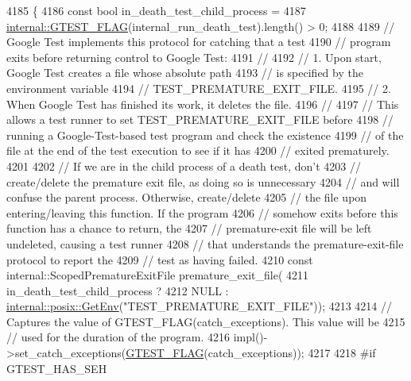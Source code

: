 \begin{DoxyCode}
4185                   \{
4186   \textcolor{keyword}{const} \textcolor{keywordtype}{bool} in\_death\_test\_child\_process =
4187       \hyperlink{gtest-port_8h_a828f4e34a1c4b510da50ec1563e3562a}{internal::GTEST\_FLAG}(internal\_run\_death\_test).length() > 0;
4188 
4189   \textcolor{comment}{// Google Test implements this protocol for catching that a test}
4190   \textcolor{comment}{// program exits before returning control to Google Test:}
4191   \textcolor{comment}{//}
4192   \textcolor{comment}{//   1. Upon start, Google Test creates a file whose absolute path}
4193   \textcolor{comment}{//      is specified by the environment variable}
4194   \textcolor{comment}{//      TEST\_PREMATURE\_EXIT\_FILE.}
4195   \textcolor{comment}{//   2. When Google Test has finished its work, it deletes the file.}
4196   \textcolor{comment}{//}
4197   \textcolor{comment}{// This allows a test runner to set TEST\_PREMATURE\_EXIT\_FILE before}
4198   \textcolor{comment}{// running a Google-Test-based test program and check the existence}
4199   \textcolor{comment}{// of the file at the end of the test execution to see if it has}
4200   \textcolor{comment}{// exited prematurely.}
4201 
4202   \textcolor{comment}{// If we are in the child process of a death test, don't}
4203   \textcolor{comment}{// create/delete the premature exit file, as doing so is unnecessary}
4204   \textcolor{comment}{// and will confuse the parent process.  Otherwise, create/delete}
4205   \textcolor{comment}{// the file upon entering/leaving this function.  If the program}
4206   \textcolor{comment}{// somehow exits before this function has a chance to return, the}
4207   \textcolor{comment}{// premature-exit file will be left undeleted, causing a test runner}
4208   \textcolor{comment}{// that understands the premature-exit-file protocol to report the}
4209   \textcolor{comment}{// test as having failed.}
4210   \textcolor{keyword}{const} internal::ScopedPrematureExitFile premature\_exit\_file(
4211       in\_death\_test\_child\_process ?
4212       NULL : \hyperlink{namespacetesting_1_1internal_1_1posix_a1d5e3da5a27eed25986859fa83cafe95}{internal::posix::GetEnv}(\textcolor{stringliteral}{"TEST\_PREMATURE\_EXIT\_FILE"}));
4213 
4214   \textcolor{comment}{// Captures the value of GTEST\_FLAG(catch\_exceptions).  This value will be}
4215   \textcolor{comment}{// used for the duration of the program.}
4216   impl()->set\_catch\_exceptions(\hyperlink{gtest-port_8h_a828f4e34a1c4b510da50ec1563e3562a}{GTEST\_FLAG}(catch\_exceptions));
4217 
4218 \textcolor{preprocessor}{#if GTEST\_HAS\_SEH}

\end{DoxyCode}
